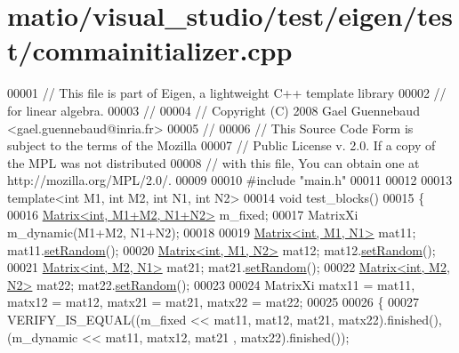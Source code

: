 \hypertarget{matio_2visual__studio_2test_2eigen_2test_2commainitializer_8cpp_source}{}\section{matio/visual\+\_\+studio/test/eigen/test/commainitializer.cpp}
\label{matio_2visual__studio_2test_2eigen_2test_2commainitializer_8cpp_source}

\begin{DoxyCode}
00001 \textcolor{comment}{// This file is part of Eigen, a lightweight C++ template library}
00002 \textcolor{comment}{// for linear algebra.}
00003 \textcolor{comment}{//}
00004 \textcolor{comment}{// Copyright (C) 2008 Gael Guennebaud <gael.guennebaud@inria.fr>}
00005 \textcolor{comment}{//}
00006 \textcolor{comment}{// This Source Code Form is subject to the terms of the Mozilla}
00007 \textcolor{comment}{// Public License v. 2.0. If a copy of the MPL was not distributed}
00008 \textcolor{comment}{// with this file, You can obtain one at http://mozilla.org/MPL/2.0/.}
00009 
00010 \textcolor{preprocessor}{#include "main.h"}
00011 
00012 
00013 \textcolor{keyword}{template}<\textcolor{keywordtype}{int} M1, \textcolor{keywordtype}{int} M2, \textcolor{keywordtype}{int} N1, \textcolor{keywordtype}{int} N2>
00014 \textcolor{keywordtype}{void} test\_blocks()
00015 \{
00016   \hyperlink{group___core___module_class_eigen_1_1_matrix}{Matrix<int, M1+M2, N1+N2>} m\_fixed;
00017   MatrixXi m\_dynamic(M1+M2, N1+N2);
00018 
00019   \hyperlink{group___core___module_class_eigen_1_1_matrix}{Matrix<int, M1, N1>} mat11; mat11.\hyperlink{class_eigen_1_1_plain_object_base_af0e576a0e1aefc9ee346de44cc352ba3}{setRandom}();
00020   \hyperlink{group___core___module_class_eigen_1_1_matrix}{Matrix<int, M1, N2>} mat12; mat12.\hyperlink{class_eigen_1_1_plain_object_base_af0e576a0e1aefc9ee346de44cc352ba3}{setRandom}();
00021   \hyperlink{group___core___module_class_eigen_1_1_matrix}{Matrix<int, M2, N1>} mat21; mat21.\hyperlink{class_eigen_1_1_plain_object_base_af0e576a0e1aefc9ee346de44cc352ba3}{setRandom}();
00022   \hyperlink{group___core___module_class_eigen_1_1_matrix}{Matrix<int, M2, N2>} mat22; mat22.\hyperlink{class_eigen_1_1_plain_object_base_af0e576a0e1aefc9ee346de44cc352ba3}{setRandom}();
00023 
00024   MatrixXi matx11 = mat11, matx12 = mat12, matx21 = mat21, matx22 = mat22;
00025 
00026   \{
00027     VERIFY\_IS\_EQUAL((m\_fixed << mat11, mat12, mat21, matx22).finished(), (m\_dynamic << mat11, matx12, mat21
      , matx22).finished());

\end{DoxyCode}

